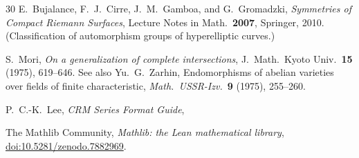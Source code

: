 \documentclass[11pt]{article}
\theoremstyle{plain}
\theoremstyle{definition}
\theoremstyle{remark}
\begin{document}
\begin{thebibliography}{30}
E.~Bujalance, F.~J.~Cirre, J.~M.~Gamboa, and G.~Gromadzki,
\emph{Symmetries of Compact Riemann Surfaces},
Lecture Notes in Math.\ \textbf{2007}, Springer, 2010.
(Classification of automorphism groups of hyperelliptic curves.)

S.~Mori,
\emph{On a generalization of complete intersections},
J.~Math.\ Kyoto Univ.\ \textbf{15} (1975), 619--646.
See also Yu.~G.~Zarhin, Endomorphisms of abelian varieties
over fields of finite characteristic,
\emph{Math.\ USSR-Izv.}\ \textbf{9} (1975), 255--260.

P.~C.-K.~Lee,
\emph{CRM Series Format Guide},

The Mathlib Community,
\emph{Mathlib: the Lean mathematical library},
\href{https://doi.org/10.5281/zenodo.7882969}{doi:10.5281/zenodo.7882969}.

\end{thebibliography}
\end{document}
